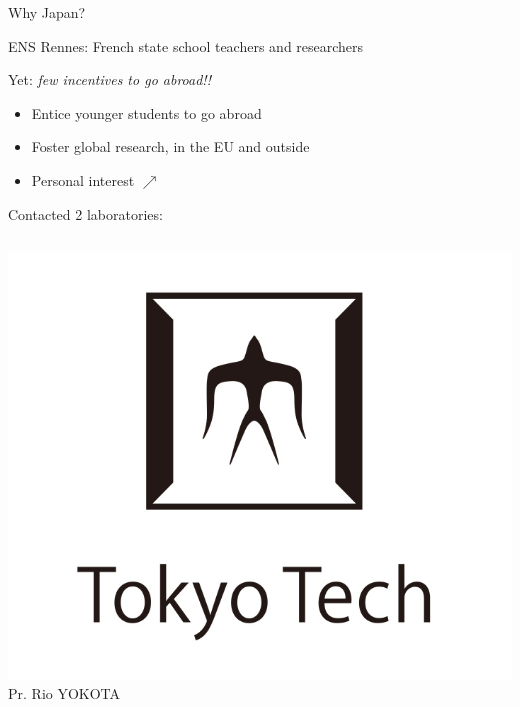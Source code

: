 \begin{frame}{Why Japan?}
	
	ENS Rennes: French state school teachers and researchers

	Yet: \emph{few incentives to go abroad!!}
	
	\begin{itemize}
		\item Entice younger students to go abroad
		\item Foster global research, in the EU and outside
		\item Personal interest $\nearrow$
	\end{itemize}


	\bigskip
	\centering
	Contacted 2 laboratories:
	
	\begin{columns}
	\includegraphics[width=1\textwidth]{tokyo_tech_logo}
 	Pr. Rio YOKOTA 
 	
 	\bigskip

 	\medskip
	

\end{columns}
\end{frame}
